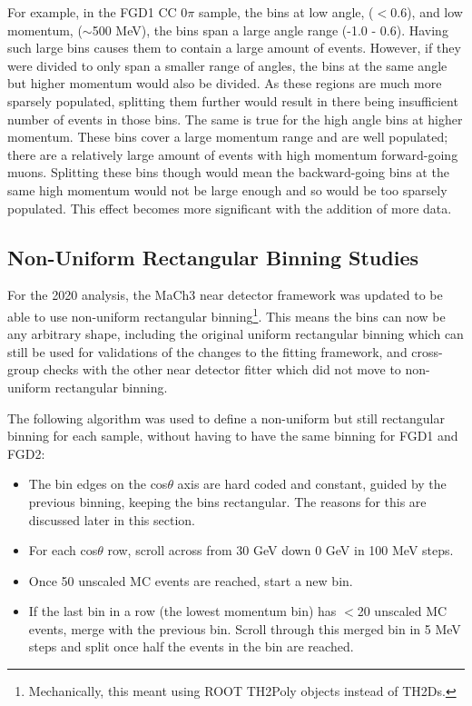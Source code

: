 For example, in the FGD1 CC 0$\pi$ sample, the bins at low angle, ($<0.6$), and low momentum, ($\sim$500 MeV), the bins span a large angle range (-1.0 - 0.6). Having such large bins causes them to contain a large amount of events. However, if they were divided to only span a smaller range of angles, the bins at the same angle but higher momentum would also be divided. As these regions are much more sparsely populated, splitting them further would result in there being insufficient number of events in those bins. The same is true for the high angle bins at higher momentum. These bins cover a large momentum range and are well populated; there are a relatively large amount of events with high momentum forward-going muons. Splitting these bins though would mean the backward-going bins at the same high momentum would not be large enough and so would be too sparsely populated. This effect becomes more significant with the addition of more data.

\subsection{Non-Uniform Rectangular Binning Studies}\label{sec:nonrecbinning}
\enlargethispage{\baselineskip}
For the 2020 analysis, the MaCh3 near detector framework was updated to be able to use non-uniform rectangular binning\footnote{Mechanically, this meant using ROOT\cite{root} TH2Poly objects instead of TH2Ds.}. This means the bins can now be any arbitrary shape, including the original uniform rectangular binning which can still be used for validations of the changes to the fitting framework, and cross-group checks with the other near detector fitter which did not move to non-uniform rectangular binning.

The following algorithm was used to define a non-uniform but still rectangular binning for each sample, without having to have the same binning for FGD1 and FGD2:

\begin{itemize}

\item The bin edges on the cos$\theta$ axis are hard coded and constant, guided by the previous binning, keeping the bins rectangular. The reasons for this are discussed later in this section.

\item For each cos$\theta$ row, scroll across from 30 GeV down 0 GeV in 100 MeV steps.

\item Once 50 unscaled MC events are reached, start a new bin.

\item If the last bin in a row (the lowest momentum bin) has $<$20 unscaled MC events, merge with the previous bin. Scroll through this merged bin in 5 MeV steps and split once half the events in the bin are reached.

\end{itemize}

